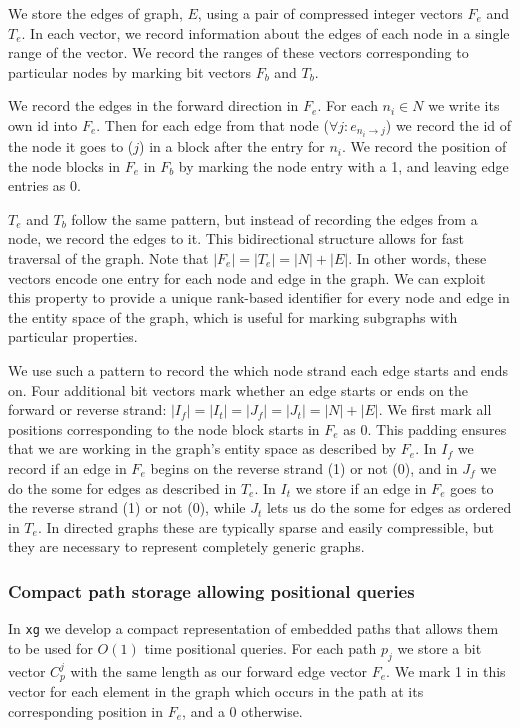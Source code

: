 \documentclass[12pt]{article}
\begin{document}
We store the edges of graph, $E$, using a pair of compressed integer vectors $F_e$ and $T_e$.
In each vector, we record information about the edges of each node in a single range of the vector.
We record the ranges of these vectors corresponding to particular nodes by marking bit vectors $F_b$ and $T_b$.

We record the edges in the forward direction in $F_e$.
For each $n_i \in N$ we write its own id into $F_e$.
Then for each edge from that node ($\forall j : e_{n_i \rightarrow j}$) we record the id of the node it goes to ($j$) in a block after the entry for $n_i$.
We record the position of the node blocks in $F_e$ in $F_b$ by marking the node entry with a 1, and leaving edge entries as 0.

$T_e$ and $T_b$ follow the same pattern, but instead of recording the edges from a node, we record the edges to it.
This bidirectional structure allows for fast traversal of the graph.
Note that $|F_e| = |T_e| = |N| + |E|$.
In other words, these vectors encode one entry for each node and edge in the graph.
We can exploit this property to provide a unique rank-based identifier for every node and edge in the entity space of the graph, which is useful for marking subgraphs with particular properties.

We use such a pattern to record the which node strand each edge starts and ends on.
Four additional bit vectors mark whether an edge starts or ends on the forward or reverse strand: $|I_f| = |I_t| = |J_f| = |J_t| = |N| + |E|$.
We first mark all positions corresponding to the node block starts in $F_e$ as 0.
This padding ensures that we are working in the graph's entity space as described by $F_e$.
In $I_f$ we record if an edge in $F_e$ begins on the reverse strand (1) or not (0), and in $J_f$ we do the some for edges as described in $T_e$.
In $I_t$ we store if an edge in $F_e$ goes to the reverse strand (1) or not (0), while $J_t$ lets us do the some for edges as ordered in $T_e$.
In directed graphs these are typically sparse and easily compressible, but they are necessary to represent completely generic graphs.

\subsubsection{Compact path storage allowing positional queries}

In {\tt xg} we develop a compact representation of embedded paths that allows them to be used for $O(1)$ time positional queries.
For each path $p_j$ we store a bit vector $C_p^j$ with the same length as our forward edge vector $F_e$.
We mark 1 in this vector for each element in the graph which occurs in the path at its corresponding position in $F_e$, and a 0 otherwise.
\end{document}
